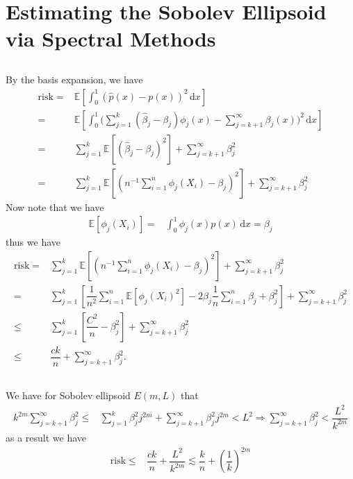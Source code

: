 \documentclass[11pt,a4paper]{ctexart}
\numberwithin{equation}{section}%
\begin{document}
\section{Estimating the Sobolev Ellipsoid via Spectral Methods}

\subsection{}
By the basis expansion, we have
\begin{align*}
    \mathrm{ risk } = & \mathbb{E}\left[ \int_0^1 (\hat{p}(x) - p(x))^2 \,\mathrm{d}x \right]   \\
    =& \mathbb{E}\left[ \int_0^1 \big( \sum_{j=1}^k \left( \hat{\beta }_j - \beta_j  \right) \phi _j(x) - \sum_{j=k+1}^\infty \beta _j(x) \big)^2 \,\mathrm{d}x \right] \\
    =& \sum_{j=1}^k \mathbb{E}\left[ \left( \hat{\beta }_j - \beta_j  \right)^2 \right] + \sum_{j=k+1}^\infty \beta _j^2\\
    =& \sum_{j=1}^k \mathbb{E}\left[ \left( n^{-1}\sum_{i=1}^n \phi _j(X_i) - \beta_j  \right)^2 \right] + \sum_{j=k+1}^\infty \beta _j^2
\end{align*}
Now note that we have
\begin{align*}
    \mathbb{E}\left[ \phi _j(X_i) \right] =& \int_0^1 \phi _j(x)p(x) \,\mathrm{d}x = \beta _j
\end{align*}
thus we have
\begin{align*}
    \mathrm{ risk } =&\sum_{j=1}^k \mathbb{E}\left[ \left( n^{-1}\sum_{i=1}^n \phi _j(X_i) - \beta_j  \right)^2 \right] + \sum_{j=k+1}^\infty \beta _j^2\\
    =& \sum_{j=1}^k \left[\dfrac{ 1 }{ n^2 }\sum_{i=1}^n \mathbb{E}\left[ \phi _j(X_i)^2 \right] - 2\beta _j \dfrac{ 1 }{ n }\sum_{i=1}^n \beta _j + \beta _j^2 \right] + \sum_{j=k+1}^\infty \beta _j^2\\
    \leq &  \sum_{j=1}^k \left[ \dfrac{ C^2 }{ n } - \beta _j^2 \right] + \sum_{j=k+1}^\infty \beta _j^2\\
    \leq & \dfrac{ ck }{ n } + \sum_{j=k+1}^\infty \beta _j^2  .
\end{align*}

\subsection{}
We have for Sobolev ellipsoid $ E(m,L) $ that
\begin{align*}
    k^{2m}\sum_{j=k+1}^\infty \beta _j^2 \leq &\sum_{j=1}^k \beta _j^2 j^{2m} + \sum_{j=k+1}^\infty \beta _j^2 j^{2m} < L^2  \Rightarrow \sum_{j=k+1}^\infty \beta _j^2 < \dfrac{ L^2 }{ k^{2m} } 
\end{align*}
as a result we have
\begin{align*}
    \mathrm{ risk } \leq & \dfrac{ ck }{ n } + \dfrac{ L^2 }{ k^{2m} } \lesssim \dfrac{ k }{ n }+ \left( \dfrac{ 1 }{ k } \right)^{2m}
\end{align*}
\end{document}
